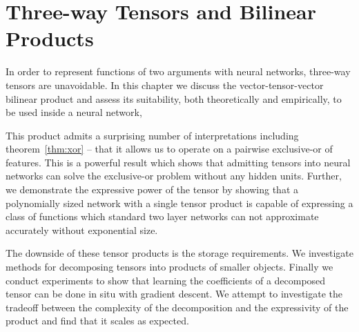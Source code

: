 
\chapter{Three-way Tensors and Bilinear Products}\label{C:tens}

In order to represent functions of two arguments with neural networks, three-way tensors are 
unavoidable. In this chapter we discuss the vector-tensor-vector bilinear product and assess its
suitability, both theoretically and empirically, to be used inside a neural network,

This product admits a surprising
number of interpretations including theorem~\ref{thm:xor} -- that it allows us to operate on a
pairwise exclusive-or of features. This is a powerful result which shows that admitting tensors
into neural networks can solve the exclusive-or problem without any hidden units. Further, we
demonstrate the expressive power of the tensor by showing that a polynomially sized network with a
single tensor product is capable of expressing a class of functions which standard two layer networks
can not approximate accurately without exponential size.

The downside of these tensor products is the storage requirements. We investigate methods for
decomposing tensors into products of smaller objects. Finally we conduct experiments to show that
learning the coefficients of a decomposed tensor can be done in situ with gradient descent. We attempt
to investigate the tradeoff between the complexity of the decomposition and the expressivity of the
product and find that it scales as expected.

